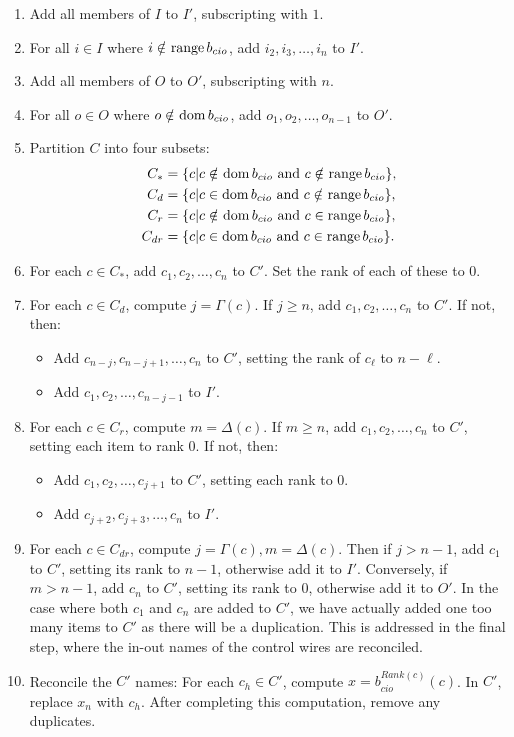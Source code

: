 \begin{enumerate}
  \item Add all members of $I$ to $I'$, subscripting with $1$.
  \item For all $i\in I$ where $i \in\hspace{-0.8em}/\hspace{0.2em} \operatorname*{range} b_{cio}$, add $i_2,i_3,\ldots,i_n$ to $I'$.
  \item Add all members of $O$ to $O'$, subscripting with $n$.
  \item For all $o\in O$ where $o \in\hspace{-0.8em}/\hspace{0.2em} \operatorname*{dom} b_{cio}$, add $o_1,o_2,\ldots,o_{n-1}$ to $O'$.
  \item Partition $C$ into four subsets:
  \begin{align*}
    C_*    &= \{c|c\nin \dom b_{cio}\text{ and }c\nin \rng b_{cio}\},\\
    C_d    &= \{c|c\in \dom b_{cio}\text{ and }c\nin \rng b_{cio}\},\\
    C_r    &= \{c|c\nin \dom b_{cio}\text{ and }c\in \rng b_{cio}\},\\
    C_{dr} &= \{c|c\in \dom b_{cio}\text{ and }c\in \rng b_{cio}\}.
  \end{align*}
  \item For each $c\in C_*$, add $c_1,c_2,\ldots,c_n$ to $C'$. Set the
    rank of each of these to $0$.
  \item For each $c\in C_d$, compute $j=\Gamma(c)$. If $j \ge n$, add
    $c_1,c_2,\ldots,c_n$ to $C'$. If not, then:
    \begin{itemize}
      \item Add $c_{n-j},c_{n-j+1},\ldots,c_n$ to $C'$, setting the
        rank of $c_\ell$ to $n-\ell$.
      \item Add $c_1,c_2,\ldots,c_{n-j-1}$ to $I'$.
    \end{itemize}
  \item For each $c\in C_r$, compute $m=\Delta(c)$. If $m \ge n$, add
    $c_1,c_2,\ldots,c_n$ to $C'$, setting each item to rank $0$.
    If not, then:
    \begin{itemize}
      \item Add $c_1,c_2,\ldots,c_{j+1}$ to $C'$, setting each rank to $0$.
      \item Add $c_{j+2},c_{j+3},\ldots,c_{n}$ to $I'$.
    \end{itemize}
  \item For each $c\in C_{dr}$, compute $j=\Gamma(c), m=\Delta(c)$. Then
    if $j>n-1$, add $c_1$ to $C'$, setting its rank to $n-1$, otherwise
    add it to $I'$. Conversely, if $m>n-1$, add $c_n$ to $C'$, setting its
    rank to $0$, otherwise add it to $O'$. In the case
    where both $c_1$ and $c_n$ are added to $C'$, we have actually added
    one too many items to $C'$ as there will be a duplication. This is
    addressed in the final step, where the in-out names of the control
    wires are reconciled.
  \item Reconcile the $C'$ names: For each $c_h\in C'$, compute
    $x=b_{cio}^{Rank(c)}(c)$. In $C'$, replace $x_n$ with $c_h$. After
    completing this computation, remove any duplicates.
\end{enumerate}

